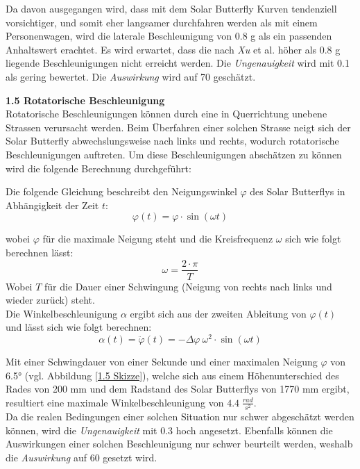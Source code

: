 \begin{description}
    Da davon ausgegangen wird, dass mit dem Solar Butterfly Kurven tendenziell vorsichtiger, und somit eher langsamer durchfahren werden als mit einem Personenwagen, wird die laterale Beschleunigung von 0.8 g als ein passenden Anhaltswert erachtet. Es wird erwartet, dass die nach \emph{Xu} et al. höher als 0.8 g liegende Beschleunigungen nicht erreicht werden. Die \emph{Ungenauigkeit} wird mit 0.1 als gering bewertet. Die \emph{Auswirkung} wird auf 70 geschätzt.

    \item \textbf{1.5 Rotatorische Beschleunigung}\\
    Rotatorische Beschleunigungen können durch eine in Querrichtung unebene Strassen verursacht werden. Beim Überfahren einer solchen Strasse neigt sich der Solar Butterfly abwechslungsweise nach links und rechts, wodurch rotatorische Beschleunigungen auftreten. Um diese Beschleunigungen abschätzen zu können wird die folgende Berechnung durchgeführt:

    Die folgende Gleichung beschreibt den Neigungswinkel $\varphi$ des Solar Butterflys in Abhängigkeit der Zeit $t$:
    \begin{equation}
      \varphi(t) = \varphi \cdot \sin \left(\omega t \right)
    \end{equation}

    wobei $\varphi$ für die maximale Neigung steht und die Kreisfrequenz $\omega$ sich wie folgt berechnen lässt:
    \begin{equation}
      \omega = \frac{2\cdot \pi}{T}
    \end{equation}
    Wobei $T$ für die Dauer einer Schwingung (Neigung von rechts nach links und wieder zurück) steht.\\
    Die Winkelbeschleunigung $\alpha$ ergibt sich aus der zweiten Ableitung von $\varphi(t)$ und lässt sich wie folgt berechnen:
    \begin{equation}
      \alpha(t) = \ddot \varphi(t) = -\Delta\varphi\:\omega^2 \cdot \sin \left(\omega t \right)
    \end{equation}

    Mit einer Schwingdauer von einer Sekunde und einer maximalen Neigung $\varphi$ von 6.5° (vgl. Abbildung \ref{1.5 Skizze}), welche sich aus einem Höhenunterschied des Rades von 200 mm und dem Radstand des Solar Butterflys von 1770 mm ergibt, resultiert eine maximale Winkelbeschleunigung von $4.4 \; \frac{rad}{s^2}$.\\
    Da die realen Bedingungen einer solchen Situation nur schwer abgeschätzt werden können, wird die \emph{Ungenauigkeit} mit 0.3 hoch angesetzt. Ebenfalls können die Auswirkungen einer solchen Beschleunigung nur schwer beurteilt werden, weshalb die \emph{Auswirkung} auf 60 gesetzt wird.


\end{description}
